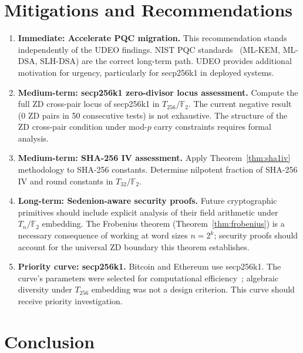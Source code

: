 \documentclass[runningheads]{llncs}
\theoremstyle{plain}
\theoremstyle{definition}
\newcommand{\GFtwo}{\mathbb{F}_2}
\begin{document}
\section{Mitigations and Recommendations}
\label{sec:mitigations}

\begin{enumerate}
\item \textbf{Immediate: Accelerate PQC migration.}
      This recommendation stands independently of the UDEO findings.
      NIST PQC standards~\cite{NIST-PQC} (ML-KEM, ML-DSA, SLH-DSA) are
      the correct long-term path. UDEO provides additional motivation
      for urgency, particularly for secp256k1 in deployed systems.

\item \textbf{Medium-term: secp256k1 zero-divisor locus assessment.}
      Compute the full ZD cross-pair locus of secp256k1 in $T_{256}/\GFtwo$.
      The current negative result (0 ZD pairs in 50 consecutive tests) is
      not exhaustive. The structure of the ZD cross-pair condition under
      mod-$p$ carry constraints requires formal analysis.

\item \textbf{Medium-term: SHA-256 IV assessment.}
      Apply Theorem~\ref{thm:sha1iv} methodology to SHA-256 constants.
      Determine nil\-potent fraction of SHA-256 IV and round constants
      in $T_{32}/\GFtwo$.

\item \textbf{Long-term: Sedenion-aware security proofs.}
      Future cryptographic primitives should include explicit analysis of
      their field arithmetic under $T_n/\GFtwo$ embedding. The Frobenius
      theorem (Theorem~\ref{thm:frobenius}) is a necessary consequence of
      working at word sizes $n = 2^k$; security proofs should account for
      the universal ZD boundary this theorem establishes.

\item \textbf{Priority curve: secp256k1.}
      Bitcoin and Ethereum use secp256k1. The curve's parameters were
      selected for computational efficiency~\cite{SEC2}; algebraic
      diversity under $T_{256}$ embedding was not a design criterion.
      This curve should receive priority investigation.
\end{enumerate}


\section{Conclusion}
\label{sec:conclusion}
\end{document}
